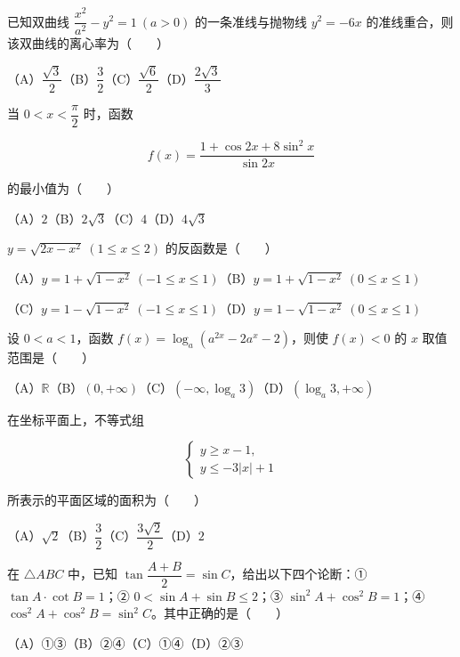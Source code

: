 \begin{question}
已知双曲线 $\dfrac{x^2}{a^2}-y^2=1\ (a>0)$ 的一条准线与抛物线 $y^2=-6x$ 的准线重合，则该双曲线的离心率为\mbox{（　　）}

（A）$\dfrac{\sqrt3}{2}$\quad（B）$\dfrac32$\quad（C）$\dfrac{\sqrt6}{2}$\quad（D）$\dfrac{2\sqrt3}{3}$

\end{question}
\begin{question}
当 $0<x<\dfrac{\pi}{2}$ 时，函数

\nopagebreak[4]
\[
f(x)=\frac{1+\cos2x+8\sin^2x}{\sin2x}
\]

的最小值为\mbox{（　　）}

（A）$2$\quad（B）$2\sqrt3$\quad（C）$4$\quad（D）$4\sqrt3$

\end{question}
\begin{question}
$y=\sqrt{2x-x^2}\ (1\leqslant x\leqslant2)$ 的反函数是\mbox{（　　）}

（A）$y=1+\sqrt{1-x^2}\ (-1\leqslant x\leqslant1)$\quad（B）$y=1+\sqrt{1-x^2}\ (0\leqslant x\leqslant1)$

（C）$y=1-\sqrt{1-x^2}\ (-1\leqslant x\leqslant1)$\quad（D）$y=1-\sqrt{1-x^2}\ (0\leqslant x\leqslant1)$

\end{question}
\begin{question}
设 $0<a<1$，函数 $f(x)=\log_a(a^{2x}-2a^x-2)$，则使 $f(x)<0$ 的 $x$ 取值范围是\mbox{（　　）}

（A）$\mathbb R$\quad（B）$(0,+\infty)$\quad（C）$(-\infty,\log_a3)$\quad（D）$(\log_a3,+\infty)$

\end{question}
\begin{question}
在坐标平面上，不等式组

\nopagebreak[4]
\[
\begin{cases}
y\geqslant x-1,\\
y\leqslant-3|x|+1
\end{cases}
\]

所表示的平面区域的面积为\mbox{（　　）}

（A）$\sqrt2$\quad（B）$\dfrac32$\quad（C）$\dfrac{3\sqrt2}{2}$\quad（D）$2$

\end{question}
\begin{question}
在 $\triangle ABC$ 中，已知 $\tan\dfrac{A+B}{2}=\sin C$，给出以下四个论断：① $\tan A\cdot\cot B=1$；② $0<\sin A+\sin B\leqslant2$；③ $\sin^2A+\cos^2B=1$；④ $\cos^2A+\cos^2B=\sin^2C$。其中正确的是\mbox{（　　）}

（A）①③\quad（B）②④\quad（C）①④\quad（D）②③

\end{question}

